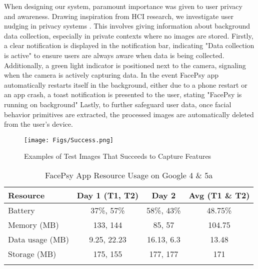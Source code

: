 When designing our system, paramount importance was given to user privacy and awareness. Drawing inspiration from HCI research, we investigate user nudging \cite{balebako2014improving, felt2012ve} in privacy systems \cite{denning2014situ}. This involves giving information about background data collection, especially in private contexts where no images are stored. Firstly, a clear notification is displayed in the notification bar, indicating "Data collection is active" to ensure users are always aware when data is being collected. Additionally, a green light indicator is positioned next to the camera, signaling when the camera is actively capturing data. In the event FacePsy app automatically restarts itself in the background, either due to a phone restart or an app crash, a toast notification is presented to the user, stating "FacePsy is running on background" Lastly, to further safeguard user data, once facial behavior primitives are extracted, the processed images are automatically deleted from the user's device.



\begin{figure}[h]
    \texttt{[image: Figs/Success.png]}
    \caption{Examples of Test Images That Succeeds to Capture Features }
    \label{fig:FacePsySuccess}
\end{figure}

\begin{table}[h]
\centering
\small
\caption{FacePsy App Resource Usage on Google 4 \& 5a}
\begin{tabular}{lccc}
\toprule
Resource & Day 1 (T1, T2) & Day 2 & Avg (T1 \& T2) \\
\midrule
Battery & 37\%, 57\% & 58\%, 43\% & 48.75\% \\
Memory (MB) & 133, 144 & 85, 57  & 104.75 \\
Data usage (MB) & 9.25, 22.23 & 16.13, 6.3 & 13.48 \\
Storage (MB) & 175, 155 & 177, 177 & 171 \\
\bottomrule
\label{tabs:RU}
\end{tabular}
\end{table}




